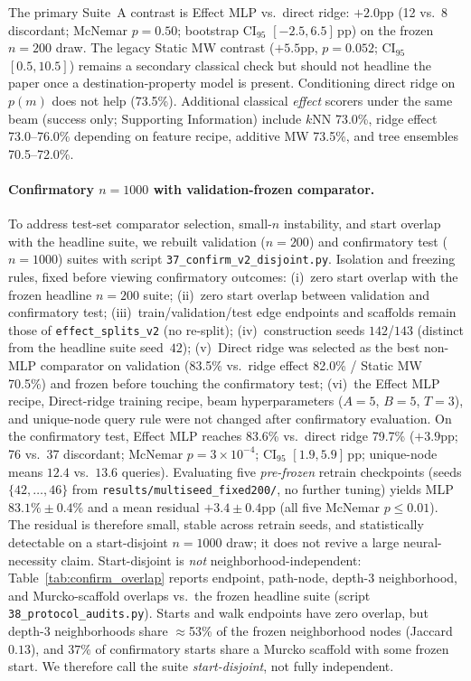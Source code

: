 The primary Suite~A contrast is Effect MLP vs.\ direct ridge: $+2.0$pp (12 vs.\ 8 discordant; McNemar $p{=}0.50$; bootstrap CI$_{95}$ $[-2.5,6.5]$\,pp) on the frozen $n{=}200$ draw. The legacy Static MW contrast ($+5.5$pp, $p{=}0.052$; CI$_{95}$ $[0.5,10.5]$) remains a secondary classical check but should not headline the paper once a destination-property model is present. Conditioning direct ridge on $p(m)$ does not help (73.5\%). Additional classical \emph{effect} scorers under the same beam (success only; Supporting Information) include $k$NN 73.0\%, ridge effect 73.0--76.0\% depending on feature recipe, additive MW 73.5\%, and tree ensembles 70.5--72.0\%.

\paragraph{Confirmatory $n{=}1000$ with validation-frozen comparator.}
To address test-set comparator selection, small-$n$ instability, and start overlap with the headline suite, we rebuilt validation ($n{=}200$) and confirmatory test ($n{=}1000$) suites with script \texttt{37\_confirm\_v2\_disjoint.py}. Isolation and freezing rules, fixed before viewing confirmatory outcomes: (i)~zero start overlap with the frozen headline $n{=}200$ suite; (ii)~zero start overlap between validation and confirmatory test; (iii)~train/validation/test edge endpoints and scaffolds remain those of \texttt{effect\_splits\_v2} (no re-split); (iv)~construction seeds $142$/$143$ (distinct from the headline suite seed~$42$); (v)~Direct ridge was selected as the best non-MLP comparator on validation (83.5\% vs.\ ridge effect 82.0\% / Static MW 70.5\%) and frozen before touching the confirmatory test; (vi)~the Effect MLP recipe, Direct-ridge training recipe, beam hyperparameters ($A{=}5$, $B{=}5$, $T{=}3$), and unique-node query rule were not changed after confirmatory evaluation. On the confirmatory test, Effect MLP reaches 83.6\% vs.\ direct ridge 79.7\% ($+3.9$pp; 76 vs.\ 37 discordant; McNemar $p{=}3\times10^{-4}$; CI$_{95}$ $[1.9,5.9]$\,pp; unique-node means $12.4$ vs.\ $13.6$ queries). Evaluating five \emph{pre-frozen} retrain checkpoints (seeds $\{42,\ldots,46\}$ from \texttt{results/multiseed\_fixed200/}, no further tuning) yields MLP $83.1\%\pm0.4\%$ and a mean residual $+3.4\pm0.4$pp (all five McNemar $p{\le}0.01$). The residual is therefore small, stable across retrain seeds, and statistically detectable on a start-disjoint $n{=}1000$ draw; it does not revive a large neural-necessity claim.
Start-disjoint is \emph{not} neighborhood-independent: Table~\ref{tab:confirm_overlap} reports endpoint, path-node, depth-3 neighborhood, and Murcko-scaffold overlaps vs.\ the frozen headline suite (script \texttt{38\_protocol\_audits.py}). Starts and walk endpoints have zero overlap, but depth-3 neighborhoods share $\approx$53\% of the frozen neighborhood nodes (Jaccard $0.13$), and $37\%$ of confirmatory starts share a Murcko scaffold with some frozen start. We therefore call the suite \emph{start-disjoint}, not fully independent.
\label{tab:chem}%

